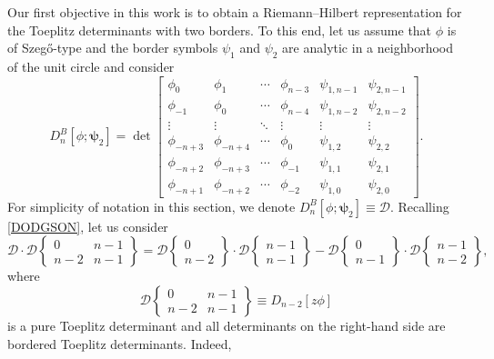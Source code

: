 \documentclass[pdftex]{sigma}
\numberwithin{equation}{section}
\begin{document}
	
	Our first objective in this work is to obtain a Riemann--Hilbert representation for the Toeplitz determinants with two borders. To this end, let us assume that $\phi$ is of Szeg\H{o}-type and the border symbols $\psi_1$ and $\psi_2$ are analytic in a neighborhood of the unit circle and consider
	\begin{equation*}
		D^B_n[\phi;\boldsymbol{\psi}_2] = \det \begin{bmatrix}
			\phi_0& \phi_{1} & \cdots & \phi_{n-3} & \psi_{1,n-1} & \psi_{2,n-1} \\
			\phi_{-1}& \phi_0 & \cdots & \phi_{n-4} & \psi_{1,n-2} & \psi_{2,n-2} \\
			\vdots & \vdots & \ddots & \vdots & \vdots & \vdots \\
			\phi_{-n+3} & \phi_{-n+4} & \cdots & \phi_{0} & \psi_{1,2} & \psi_{2,2}\\
			\phi_{-n+2} & \phi_{-n+3} & \cdots & \phi_{-1} & \psi_{1,1} & \psi_{2,1} \\
			\phi_{-n+1} & \phi_{-n+2} & \cdots & \phi_{-2} & \psi_{1,0} & \psi_{2,0}
		\end{bmatrix}.
	\end{equation*}
	For simplicity of notation in this section, we denote $D^B_n[\phi;\boldsymbol{\psi}_2] \equiv \mathscr{D}$.
	Recalling \eqref{DODGSON}, let us consider
	\begin{equation}\label{DODGSON3}
		\mathscr{D} \cdot \mathscr{D}\left\lbrace \begin{matrix} 0 & n-1 \\ n-2& n-1 \end{matrix} \right\rbrace = \mathscr{D}\left\lbrace \begin{matrix} 0 \\ n-2 \end{matrix} \right\rbrace \cdot \mathscr{D}\left\lbrace \begin{matrix} n-1 \\ n-1 \end{matrix} \right\rbrace - \mathscr{D}\left\lbrace \begin{matrix} 0 \\ n-1 \end{matrix} \right\rbrace \cdot \mathscr{D}\left\lbrace \begin{matrix} n-1 \\ n-2 \end{matrix} \right\rbrace,
	\end{equation}
	where
\begin{equation*}\label{zphi}
		\mathscr{D}\left\lbrace \begin{matrix} 0 & n-1 \\ n-2& n-1 \end{matrix} \right\rbrace \equiv D_{n-2}[z \phi]
	\end{equation*} is a pure Toeplitz determinant and all determinants on the right-hand side are bordered Toeplitz determinants. Indeed,
\end{document}
